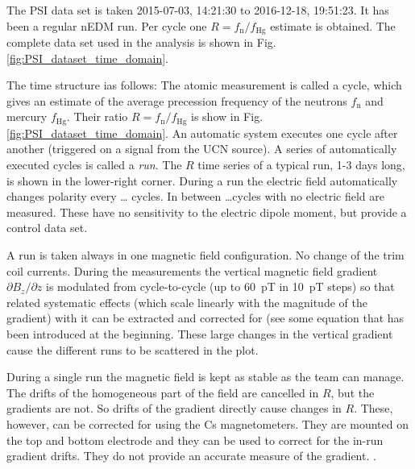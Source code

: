 The PSI data set is taken 2015-07-03, 14:21:30 to 2016-12-18, 19:51:23. It has been a regular nEDM run. Per cycle one $R = f_\mathrm{n} / f_\mathrm{Hg}$ estimate is obtained. The complete data set used in the analysis is shown in Fig.\,\ref{fig:PSI_dataset_time_domain}.

The time structure ias follows: The atomic measurement is called a cycle, which gives an estimate of the average precession frequency of the neutrons $f_\mathrm{n}$ and mercury $f_\mathrm{Hg}$. Their ratio $R = f_\mathrm{n} / f_\mathrm{Hg}$ is show in Fig.\,\ref{fig:PSI_dataset_time_domain}. An automatic system executes one cycle after another (triggered on a signal from the UCN source). A series of automatically executed cycles is called a \emph{run}. The $R$ time series of a typical run, 1-3 days long, is shown in the lower-right corner. During a run the electric field automatically changes polarity every \ldots {} cycles. In between \ldots cycles with no electric field are measured. These have no sensitivity to the electric dipole moment, but provide a control data set.

A run is taken always in one magnetic field configuration. No change of the trim coil currents. During the measurements the vertical magnetic field gradient $\partial B_z / \partial z$ is modulated from cycle-to-cycle (up to \SI{60}{\pico\tesla} in \SI{10}{\pico\tesla} steps) so that related systematic effects (which scale linearly with the magnitude of the gradient) with it can be extracted and corrected for (see some equation that has been introduced at the beginning. These large changes in the vertical gradient cause the different runs to be scattered in the plot.

During a single run the magnetic field is kept as stable as the team can manage. The drifts of the homogeneous part of the field are cancelled in $R$, but the gradients are not. So drifts of the gradient directly cause changes in $R$. These, however, can be corrected for using the Cs magnetometers. They are mounted on the top and bottom electrode and they can be used to correct for the in-run gradient drifts. They do not provide an accurate measure of the gradient. .

